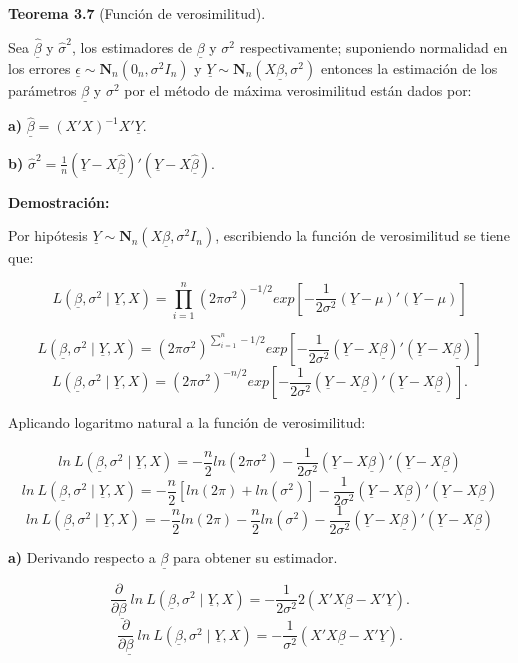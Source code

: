 \documentclass[
  a4paper,
  oneside,
  openany]{book}
\begin{document}
\textbf{Teorema 3.7} (Función de verosimilitud).

Sea \(\underline{\hat{\beta}}\) y \(\hat{\sigma}^2\), los estimadores de \(\underline{\beta}\) y \(\sigma^2\) respectivamente; suponiendo normalidad en los errores \(\underline{\epsilon} \sim \mathbf{N}_{n}(0_{n},\sigma^2 I_{n})\) y \(\underline{Y}\sim \mathbf{N}_{n}(X \underline{\beta},\sigma^2)\) entonces la estimación de los parámetros \(\underline{\beta}\) y \(\sigma^2\) por el método de máxima verosimilitud están dados por:

\textbf{a)} \(\underline{\hat{\beta}}=(X'X)^{-1}X'\underline{Y}\).

\textbf{b)} \(\hat{\sigma}^2=\frac{1}{n}\left( \underline{Y}-X\underline{\hat{\beta}}\right)'\left(\underline{Y}-X \underline{\hat{\beta}}\right).\)

\textbf{Demostración:}

Por hipótesis \(\underline{Y}\sim \mathbf{N}_{n}(X\underline{\beta},\sigma^2 I_{n})\), escribiendo la función de verosimilitud se tiene que:

\[
L(\underline{\beta},\sigma^2 \mid \underline{Y},X)=\prod_{i=1}^{n}(2\pi\sigma^2)^{-1/2} exp \left[ - \frac{1}{2\sigma^2}(\underline{Y}-\mu)'(\underline{Y}-\mu) \right]
\]

\[
L(\underline{\beta},\sigma^2 \mid \underline{Y},X)=(2\pi\sigma^2)^{\sum_{i=1}^{n}-1/2} exp \left[ - \frac{1}{2\sigma^2}(\underline{Y}-X\underline{\beta})'(\underline{Y}-X\underline{\beta}) \right]
\]
\[
L(\underline{\beta},\sigma^2 \mid \underline{Y},X)=(2\pi\sigma^2)^{-n/2} exp \left[ - \frac{1}{2\sigma^2}(\underline{Y}-X\underline{\beta})'(\underline{Y}-X\underline{\beta}) \right].
\]

Aplicando logaritmo natural a la función de verosimilitud:

\[
ln \ L(\underline{\beta},\sigma^2 \mid \underline{Y},X)= -\frac{n}{2}ln(2\pi\sigma^2)-\frac{1}{2\sigma^2}(\underline{Y}-X\underline{\beta})'(\underline{Y}-X\underline{\beta})
\]
\[ln \ L(\underline{\beta},\sigma^2 \mid \underline{Y},X)= -\frac{n}{2}[ln(2\pi)+ln(\sigma^2)]-\frac{1}{2\sigma^2}(\underline{Y}-X\underline{\beta})'(\underline{Y}-X\underline{\beta})\]
\[ln \ L(\underline{\beta},\sigma^2 \mid \underline{Y},X)= -\frac{n}{2}ln(2\pi)-\frac{n}{2}ln(\sigma^2)-\frac{1}{2\sigma^2}(\underline{Y}-X\underline{\beta})'(\underline{Y}-X\underline{\beta})\]

\textbf{a)} Derivando respecto a \(\underline{\beta}\) para obtener su estimador.

\[\frac{\partial}{\partial \underline{\beta}} \ ln \ L(\underline{\beta},\sigma^2 \mid \underline{Y},X)=-\frac{1}{2\sigma^2}2(X'X\underline{\beta}-X'\underline{Y}).\]
\[\frac{\partial}{\partial \underline{\beta}} \ ln \ L(\underline{\beta},\sigma^2 \mid \underline{Y},X)=-\frac{1}{\sigma^2}(X'X\underline{\beta}-X'\underline{Y}).\]
\end{document}
